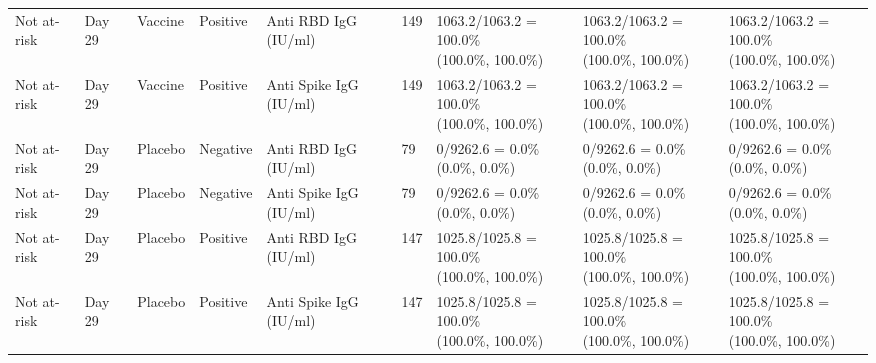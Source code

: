 \documentclass[]{book}
\theoremstyle{definition}
\theoremstyle{definition}
\theoremstyle{definition}
\newcommand{\1}{\mathbbm{1}}
\begin{document}
\begin{landscape}
\begin{ThreePartTable}
\begin{longtable}[t]{>{\raggedright\arraybackslash}p{2.7cm}llllllll}
\hspace{1em}Not at-risk & Day 29 & Vaccine & Positive & Anti RBD IgG (IU/ml) & 149 & \makecell[l]{1063.2/1063.2 = 100.0\%\\(100.0\%, 100.0\%)} & \makecell[l]{1063.2/1063.2 = 100.0\%\\(100.0\%, 100.0\%)} & \makecell[l]{1063.2/1063.2 = 100.0\%\\(100.0\%, 100.0\%)}\\
\hspace{1em}Not at-risk & Day 29 & Vaccine & Positive & Anti Spike IgG (IU/ml) & 149 & \makecell[l]{1063.2/1063.2 = 100.0\%\\(100.0\%, 100.0\%)} & \makecell[l]{1063.2/1063.2 = 100.0\%\\(100.0\%, 100.0\%)} & \makecell[l]{1063.2/1063.2 = 100.0\%\\(100.0\%, 100.0\%)}\\
\hspace{1em}Not at-risk & Day 29 & Placebo & Negative & Anti RBD IgG (IU/ml) & 79 & \makecell[l]{0/9262.6 = 0.0\%\\(0.0\%, 0.0\%)} & \makecell[l]{0/9262.6 = 0.0\%\\(0.0\%, 0.0\%)} & \makecell[l]{0/9262.6 = 0.0\%\\(0.0\%, 0.0\%)}\\
\hspace{1em}Not at-risk & Day 29 & Placebo & Negative & Anti Spike IgG (IU/ml) & 79 & \makecell[l]{0/9262.6 = 0.0\%\\(0.0\%, 0.0\%)} & \makecell[l]{0/9262.6 = 0.0\%\\(0.0\%, 0.0\%)} & \makecell[l]{0/9262.6 = 0.0\%\\(0.0\%, 0.0\%)}\\
\hspace{1em}Not at-risk & Day 29 & Placebo & Positive & Anti RBD IgG (IU/ml) & 147 & \makecell[l]{1025.8/1025.8 = 100.0\%\\(100.0\%, 100.0\%)} & \makecell[l]{1025.8/1025.8 = 100.0\%\\(100.0\%, 100.0\%)} & \makecell[l]{1025.8/1025.8 = 100.0\%\\(100.0\%, 100.0\%)}\\
\hspace{1em}Not at-risk & Day 29 & Placebo & Positive & Anti Spike IgG (IU/ml) & 147 & \makecell[l]{1025.8/1025.8 = 100.0\%\\(100.0\%, 100.0\%)} & \makecell[l]{1025.8/1025.8 = 100.0\%\\(100.0\%, 100.0\%)} & \makecell[l]{1025.8/1025.8 = 100.0\%\\(100.0\%, 100.0\%)}\\

\end{longtable}
\end{ThreePartTable}
\end{landscape}
\end{document}
